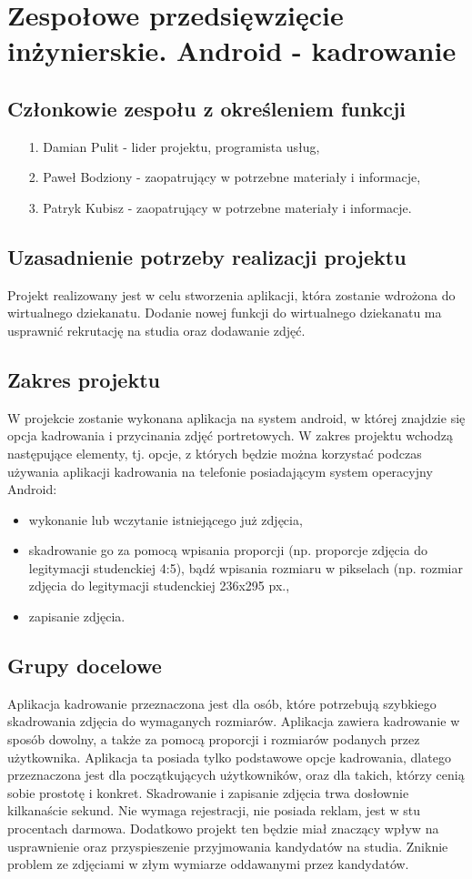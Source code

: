 \chapter {Zespołowe przedsięwzięcie inżynierskie. Android - kadrowanie}
\section{Członkowie zespołu z określeniem funkcji}
\begin{itemize}
\item [1.] Damian Pulit - lider projektu, programista usług,
\item [2.] Paweł Bodziony - zaopatrujący w potrzebne materiały i informacje,
\item [3.] Patryk Kubisz - zaopatrujący w potrzebne materiały i informacje. 
\end{itemize}
\section {Uzasadnienie potrzeby realizacji projektu}
Projekt realizowany jest w celu stworzenia aplikacji, która zostanie wdrożona do wirtualnego dziekanatu.
Dodanie nowej funkcji do wirtualnego dziekanatu ma usprawnić rekrutację na studia oraz dodawanie zdjęć.
\section {Zakres projektu}
W projekcie zostanie wykonana aplikacja na system android, w której znajdzie się opcja kadrowania i przycinania zdjęć portretowych. W zakres projektu wchodzą następujące elementy, tj. opcje, z których będzie można korzystać podczas używania aplikacji kadrowania na telefonie posiadającym system operacyjny Android:
\begin{itemize}
\item wykonanie lub wczytanie istniejącego już zdjęcia,
\item skadrowanie go za pomocą wpisania proporcji (np. proporcje zdjęcia do legitymacji studenckiej 4:5), bądź wpisania rozmiaru w pikselach (np. rozmiar zdjęcia do legitymacji studenckiej 236x295 px.,
\item zapisanie zdjęcia.
\end{itemize}
\newpage

\section{Grupy docelowe}
Aplikacja kadrowanie przeznaczona jest dla osób, które potrzebują szybkiego skadrowania zdjęcia do wymaganych rozmiarów. Aplikacja zawiera kadrowanie w sposób dowolny, a także za pomocą proporcji i rozmiarów podanych przez użytkownika. Aplikacja ta posiada tylko podstawowe opcje kadrowania, dlatego przeznaczona jest dla początkujących użytkowników, oraz dla takich, którzy cenią sobie prostotę i konkret. Skadrowanie i zapisanie zdjęcia trwa dosłownie kilkanaście sekund. Nie wymaga rejestracji, nie posiada reklam, jest w stu procentach darmowa. Dodatkowo projekt ten będzie miał znaczący wpływ na usprawnienie oraz przyspieszenie przyjmowania kandydatów na studia. Zniknie problem ze zdjęciami w złym wymiarze oddawanymi przez kandydatów.


